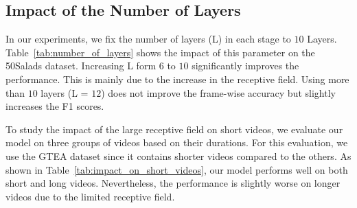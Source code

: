 \documentclass[10pt,twocolumn,letterpaper]{article}
\begin{document}
\subsection{Impact of the Number of Layers}
In our experiments, we fix the number of layers (L) in each stage to $10$ Layers. 
Table~\ref{tab:number_of_layers} shows the impact of this parameter on 
the 50Salads dataset. Increasing L form $6$ to $10$ significantly 
improves the performance. This is mainly due to the increase in the 
receptive field. Using more than $10$ layers (L = $12$) does not improve 
the frame-wise accuracy but slightly increases the F1 scores.

\begin{table}[tb]
\centering
{}
\caption{Effect of the number of layers (L) in each stage on the 50Salads dataset.}
\label{tab:number_of_layers}
\end{table}

To study the impact of the large receptive field on short videos, we 
evaluate our model on three groups of videos based on their durations. 
For this evaluation, we use the GTEA dataset since it contains shorter videos 
compared to the others. As shown in Table~\ref{tab:impact_on_short_videos}, our 
model performs well on both short and long videos. Nevertheless, the performance is 
slightly worse on longer videos due to the limited receptive field.

\begin{table}[tb]
\centering
{}
\caption{Evaluation of three groups of videos based on their durations on the GTEA dataset.}
\label{tab:impact_on_short_videos}
\end{table}
\end{document}
